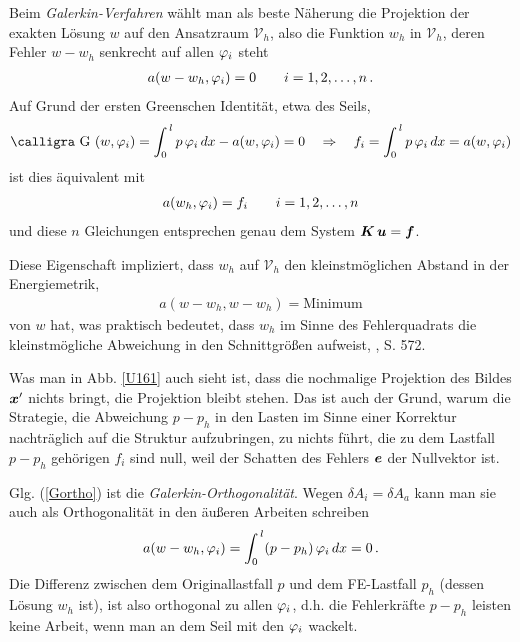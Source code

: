 Beim {\em Galerkin-Verfahren\/} w\"{a}hlt man als beste N\"{a}herung die Projektion der exakten L\"{o}sung $w$ auf den Ansatzraum $\mathcal{V}_h$, also die Funktion $w_h$ in $\mathcal{V}_h$, deren Fehler $w - w_h$ senkrecht auf allen $\varphi_i$ steht
\begin{align}\label{Gortho}
 a(w - w_h,\varphi_i) = 0 \qquad i = 1,2, \ldots, n\,.
\end{align}
Auf Grund der ersten Greenschen Identit\"{a}t, etwa des Seils,
\begin{align}\label{Eq89}
\text{\normalfont\calligra G\,\,}(w,\Np_i) = \int_0^{\,l} p\,\Np_i\,dx - a(w,\Np_i) = 0 \quad \Rightarrow \quad f_i = \int_0^{\,l} p\,\Np_i\,dx = a(w,\Np_i)
\end{align}
ist dies \"{a}quivalent mit
\begin{align}
 a(w_h,\varphi_i) = f_i \qquad i = 1,2, \ldots, n
\end{align}
und diese $n$ Gleichungen entsprechen genau dem System $\mbox{\boldmath $K$}\,\mbox{\boldmath $u$} = \mbox{\boldmath $f$}$.

Diese Eigenschaft impliziert, dass $w_h$ auf $\mathcal{V}_h$ den kleinstm\"{o}glichen Abstand in der Energiemetrik,
\begin{align}\label{Eq109}
a(w-w_h,w-w_h) = \text{Minimum}
\end{align}
von $w$ hat, was praktisch bedeutet, dass $w_h$ im Sinne des Fehlerquadrats die kleinstm\"{o}gliche Abweichung in den Schnittgr\"{o}{\ss}en aufweist, \cite{Ha5}, S. 572.

Was man in Abb. \ref{U161} auch sieht ist, dass die nochmalige Projektion des Bildes $\mbox{\boldmath $x$}'$ nichts bringt, die Projektion bleibt stehen. Das ist auch der Grund, warum die Strategie, die Abweichung  $p - p_h$ in den Lasten im Sinne einer Korrektur nachtr\"{a}glich auf die Struktur aufzubringen, zu nichts f\"{u}hrt, die zu dem Lastfall $p - p_h$ geh\"{o}rigen $f_i$ sind null, weil der Schatten des Fehlers $\mbox{\boldmath $e$}$ der Nullvektor ist.

Glg. (\ref{Gortho}) ist die {\em Galerkin-Orthogonalit\"{a}t\/}. Wegen $\delta A_i = \delta A_a$ kann man sie auch als Orthogonalit\"{a}t in den \"{a}u{\ss}eren Arbeiten schreiben
\begin{align}
a(w-w_h,\varphi_i) = \int_0^{\,l} (p - p_h)\,\varphi_i\,dx = 0\,.
\end{align}
Die Differenz zwischen dem Originallastfall $p$ und dem FE-Lastfall $p_h$ (dessen L\"{o}sung $w_h$ ist), ist also orthogonal zu allen $\varphi_i$, d.h. die Fehlerkr\"{a}fte $p - p_h$ leisten keine Arbeit, wenn man an dem Seil mit den $\varphi_i$ wackelt.


